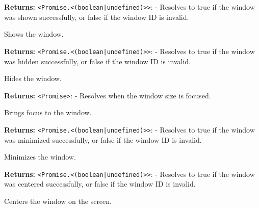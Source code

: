 \documentclass[12pt,a4paper]{article}
\begin{document}
\noindent \textbf{Returns:} \texttt{<Promise.<(boolean|undefined)>>}: - Resolves to \textasciigrave{}true\textasciigrave{} if the window was shown successfully, or \textasciigrave{}false\textasciigrave{} if the window ID is invalid.

\noindent Shows the window.

\vspace{5mm}
\noindent {}


\noindent \textbf{Returns:} \texttt{<Promise.<(boolean|undefined)>>}: - Resolves to \textasciigrave{}true\textasciigrave{} if the window was hidden successfully, or \textasciigrave{}false\textasciigrave{} if the window ID is invalid.

\noindent Hides the window.

\vspace{5mm}
\noindent {}


\noindent \textbf{Returns:} \texttt{<Promise>}: - Resolves when the window size is focused.

\noindent Brings focus to the window.

\vspace{5mm}
\noindent {}


\noindent \textbf{Returns:} \texttt{<Promise.<(boolean|undefined)>>}: - Resolves to \textasciigrave{}true\textasciigrave{} if the window was minimized successfully, or \textasciigrave{}false\textasciigrave{} if the window ID is invalid.

\noindent Minimizes the window.

\vspace{5mm}
\noindent {}


\noindent \textbf{Returns:} \texttt{<Promise.<(boolean|undefined)>>}: - Resolves to \textasciigrave{}true\textasciigrave{} if the window was centered successfully, or \textasciigrave{}false\textasciigrave{} if the window ID is invalid.

\noindent Centers the window on the screen.
\end{document}
